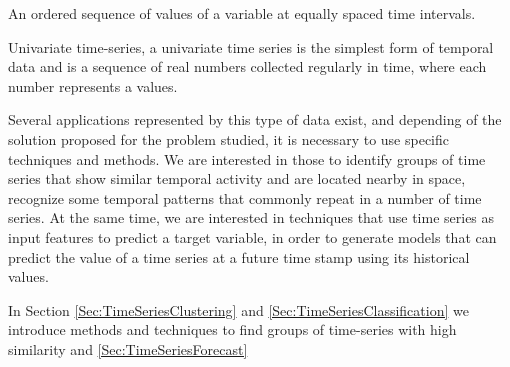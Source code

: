\begin{definition}
	An ordered sequence of values of a variable at equally spaced time intervals. 
\end{definition}

\begin{definition}
	Univariate time-series, a univariate time series is the simplest form of temporal data and is a sequence of real numbers collected regularly in time, where each number represents a values.
\end{definition}

Several applications represented by this type of data exist, and depending of the solution proposed for the problem studied, it is necessary to use specific techniques and methods. We are interested in those to identify groups of time series that show similar temporal activity and are located nearby in space, recognize some temporal patterns that commonly repeat in a number of time series. At the same time, we are interested in techniques that use time series as input features to predict a target variable, in order to generate models that can predict the value of a time series at a future time stamp using its historical values.

%
%
%
In Section \ref{Sec:TimeSeriesClustering} and \ref{Sec:TimeSeriesClassification} we introduce methods and techniques to find groups of time-series with high similarity and \ref{Sec:TimeSeriesForecast}

